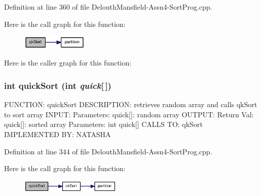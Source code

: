 Definition at line 360 of file DelouthMansfield-\/Assn4-\/SortProg.cpp.



Here is the call graph for this function:\nopagebreak
\begin{figure}[H]
\begin{center}
\leavevmode
\includegraphics[width=89pt]{_delouth_mansfield-_assn4-_sort_prog_8cpp_a4b4f1e40ba9dfe94bf95212975063b17_cgraph}
\end{center}
\end{figure}




Here is the caller graph for this function:

\hypertarget{_delouth_mansfield-_assn4-_sort_prog_8cpp_a9e940b0f849a62e9ff4319606269ae38}{
\subsubsection[{quickSort}]{\setlength{\rightskip}{0pt plus 5cm}int quickSort (int {\em quick}\mbox{[}$\,$\mbox{]})}}
\label{_delouth_mansfield-_assn4-_sort_prog_8cpp_a9e940b0f849a62e9ff4319606269ae38}
FUNCTION: quickSort DESCRIPTION: retrieves random array and calls qkSort to sort array INPUT: Parameters: quick\mbox{[}\mbox{]}: random array OUTPUT: Return Val: quick\mbox{[}\mbox{]}: sorted array Parameters: int quick\mbox{[}\mbox{]} CALLS TO: qkSort IMPLEMENTED BY: NATASHA 

Definition at line 344 of file DelouthMansfield-\/Assn4-\/SortProg.cpp.



Here is the call graph for this function:\nopagebreak
\begin{figure}[H]
\begin{center}
\leavevmode
\includegraphics[width=136pt]{_delouth_mansfield-_assn4-_sort_prog_8cpp_a9e940b0f849a62e9ff4319606269ae38_cgraph}
\end{center}
\end{figure}


